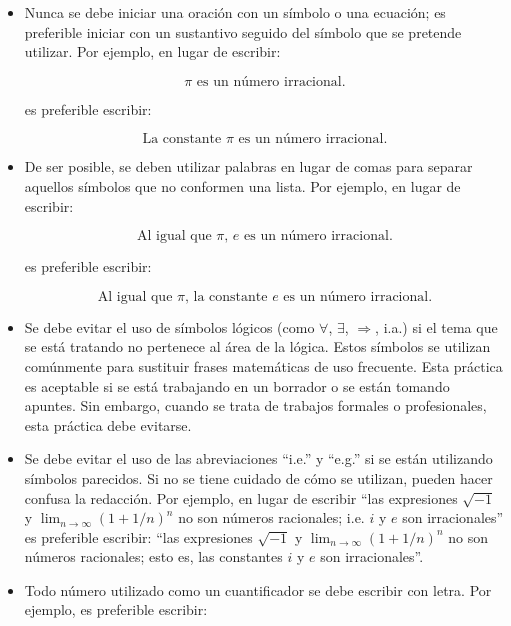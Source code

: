 \begin{itemize}
    \item Nunca se debe iniciar una oración con un símbolo o una ecuación; es 
    preferible iniciar con un sustantivo seguido del símbolo que se pretende utilizar.
    Por ejemplo, en lugar de escribir:
    
    \[
        \pi\text{ es un número irracional.}
    \]
        
    es preferible escribir:
    
    \[
        \text{La constante }\pi\text{ es un número irracional.}
    \]
    
    \item De ser posible, se deben utilizar palabras en lugar de comas para separar
    aquellos símbolos que no conformen una lista. Por ejemplo, en lugar
    de escribir:
    
    \[
        \text{Al igual que }\pi\text{, }e\text{ es un número irracional.}
    \]
        
    es preferible escribir:
    
    \[
        \text{Al igual que }\pi\text{, la constante }e\text{ es un número irracional.}
    \]

    \item Se debe evitar el uso de símbolos lógicos (como $\forall$,
    $\exists$, $\Rightarrow$, i.a.) si el tema que se está tratando no
    pertenece al área de la lógica. Estos símbolos se utilizan comúnmente 
    para sustituir frases matemáticas de uso frecuente. Esta práctica es 
    aceptable si se está trabajando en un borrador o se están tomando apuntes. 
    Sin embargo, cuando se trata de trabajos formales o profesionales, 
    esta práctica debe evitarse.

    \item Se debe evitar el uso de las abreviaciones ``i.e.'' y ``e.g.''
    si se están utilizando símbolos parecidos. Si no se tiene cuidado de cómo 
    se utilizan, pueden hacer confusa la redacción. Por ejemplo, 
    en lugar de escribir ``las expresiones
    $\sqrt{-1}$ y $\lim_{n\to\infty}\left(1+1/n\right)^{n}$ no son números
    racionales; i.e. $i$ y $e$ son irracionales'' es preferible escribir:
    ``las expresiones $\sqrt{-1}$ y $\lim_{n\to\infty}\left(1+1/n\right)^{n}$
    no son números racionales; esto es, las constantes $i$ y $e$ son
    irracionales''.

    \item Todo número utilizado como un cuantificador se debe escribir con letra.
    Por ejemplo, es preferible escribir:
    

\end{itemize}
